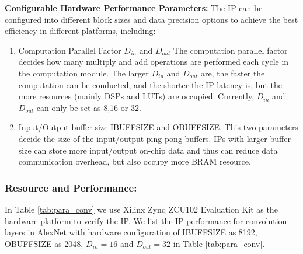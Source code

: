 \documentclass[a4paper, 11pt]{article}
\begin{document}
    
    \textbf{Configurable Hardware Performance Parameters:}
    The IP can be configured into different block sizes and data precision options to achieve the best efficiency in different platforms, including:
    
    \begin{enumerate}

    \item {
    Computation Parallel Factor $D_{in}$ and $D_{out}$
    The computation parallel factor decides how many multiply and add operations are performed each cycle in the computation module.
    The larger $D_{in}$ and $D_{out}$ are, the faster the computation can be conducted, and the shorter the IP latency is, but the more resources (mainly DSPs and LUTs) are occupied. Currently, $D_{in}$ and $D_{out}$ can only be set as 8,16 or 32.
    }
    \item {
    Input/Output buffer size IBUFFSIZE and OBUFFSIZE.
    This two parameters decide the size of the input/output ping-pong buffers. IPs with larger buffer size can store more input/output on-chip data and thus can reduce data communication overhead, but also occupy more BRAM resource.
    }
\end{enumerate}

    

\subsubsection{Resource and Performance: } 
In Table \ref{tab:para_conv} 
    we use Xilinx Zynq ZCU102 Evaluation Kit as the hardware platform to verify the IP.
    We list the IP performance for convolution layers in AlexNet with hardware configuration of IBUFFSIZE as 8192, OBUFFSIZE as 2048, $D_{in}=16$ and $D_{out}=32$ in Table \ref{tab:para_conv}.
\end{document}
